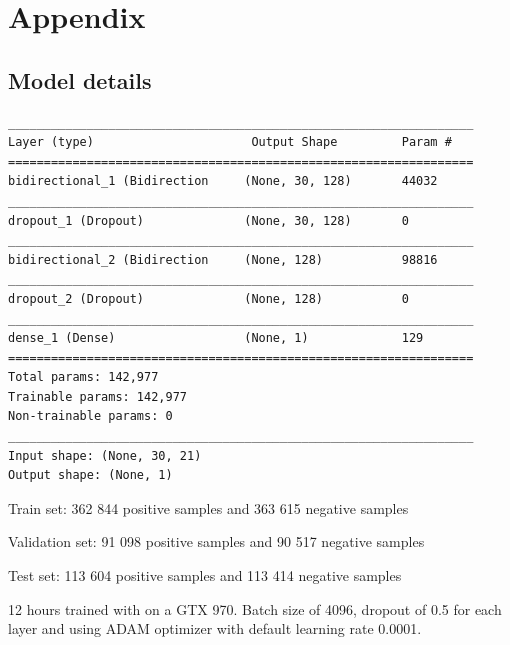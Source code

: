 
\newpage

\section{Appendix}

\subsection{Model details}\label{sec:model_details}

\begin{lstlisting}
_________________________________________________________________
Layer (type)                      Output Shape         Param #   
=================================================================
bidirectional_1 (Bidirection     (None, 30, 128)       44032     
_________________________________________________________________
dropout_1 (Dropout)              (None, 30, 128)       0         
_________________________________________________________________
bidirectional_2 (Bidirection     (None, 128)           98816     
_________________________________________________________________
dropout_2 (Dropout)              (None, 128)           0         
_________________________________________________________________
dense_1 (Dense)                  (None, 1)             129       
=================================================================
Total params: 142,977
Trainable params: 142,977
Non-trainable params: 0
_________________________________________________________________
Input shape: (None, 30, 21)
Output shape: (None, 1)

\end{lstlisting}

Train set: 362 844 positive samples and 363 615 negative samples

Validation set: 91 098 positive samples and 90 517 negative samples

Test set: 113 604 positive samples and 113 414 negative samples
\newline

12 hours trained with on a GTX 970.
Batch size of 4096, dropout of 0.5 for each layer and using ADAM optimizer with default learning rate 0.0001.
\newline  %


